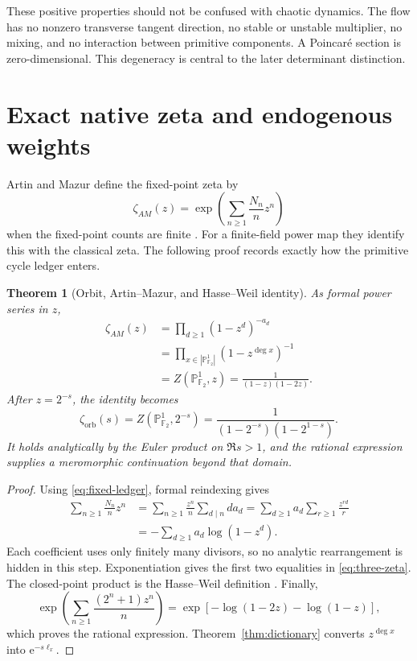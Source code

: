 \documentclass[11pt]{article}
\newtheorem{theorem}{Theorem}
\theoremstyle{definition}
\theoremstyle{remark}
\newcommand{\F}{\mathbb{F}}
\newcommand{\e}{\mathrm{e}}
\begin{document}
These positive properties should not be confused with chaotic dynamics.  The
flow has no nonzero transverse tangent direction, no stable or unstable
multiplier, no mixing, and no interaction between primitive components.  A
Poincar\'e section is zero-dimensional.  This degeneracy is central to the
later determinant distinction.

\section{Exact native zeta and endogenous weights}
\label{sec:zeta}

Artin and Mazur define the fixed-point zeta by
\begin{equation}
  \zeta_{AM}(z)
   =\exp\!\left(\sum_{n\geq1}\frac{N_n}{n}z^n\right)
  \label{eq:am}
\end{equation}
when the fixed-point counts are finite \citep[p.~84]{ArtinMazur1965}.
For a finite-field power map they identify this with the classical zeta.  The
following proof records exactly how the primitive cycle ledger enters.

\begin{theorem}[Orbit, Artin--Mazur, and Hasse--Weil identity]
\label{thm:zeta}
As formal power series in \(z\),
\begin{equation}
\begin{aligned}
  \zeta_{AM}(z)
   &=\prod_{d\geq1}(1-z^d)^{-a_d}\\
   &=\prod_{x\in|\mathbb P^1_{\F_2}|}
       (1-z^{\deg x})^{-1}\\
   &=Z(\mathbb P^1_{\F_2},z)
    =\frac1{(1-z)(1-2z)}.
\end{aligned}
\label{eq:three-zeta}
\end{equation}
After \(z=2^{-s}\), the identity becomes
\begin{equation}
  \boxed{
  \zeta_{\mathrm{orb}}(s)
  =Z(\mathbb P^1_{\F_2},2^{-s})
  =\frac1{(1-2^{-s})(1-2^{1-s})}.}
  \label{eq:boxed-zeta}
\end{equation}
It holds analytically by the Euler product on \(\Re s>1\), and the rational
expression supplies a meromorphic continuation beyond that domain.
\end{theorem}

\begin{proof}
Using \eqref{eq:fixed-ledger}, formal reindexing gives
\[
\begin{aligned}
 \sum_{n\geq1}\frac{N_n}{n}z^n
  &=\sum_{n\geq1}\frac{z^n}{n}\sum_{d\mid n}d a_d
    =\sum_{d\geq1}a_d\sum_{r\geq1}\frac{z^{rd}}r\\
  &=-\sum_{d\geq1}a_d\log(1-z^d).
\end{aligned}
\]
Each coefficient uses only finitely many divisors, so no analytic
rearrangement is hidden in this step.  Exponentiation gives the first two
equalities in \eqref{eq:three-zeta}.  The closed-point product is the
Hasse--Weil definition \citep[Sec.~1.1]{Deligne1974}.  Finally,
\[
  \exp\!\left(\sum_{n\geq1}\frac{(2^n+1)z^n}{n}\right)
  =\exp[-\log(1-2z)-\log(1-z)],
\]
which proves the rational expression.  Theorem~\ref{thm:dictionary} converts
\(z^{\deg x}\) into \(\e^{-s\ell_x}\).
\end{proof}
\end{document}
